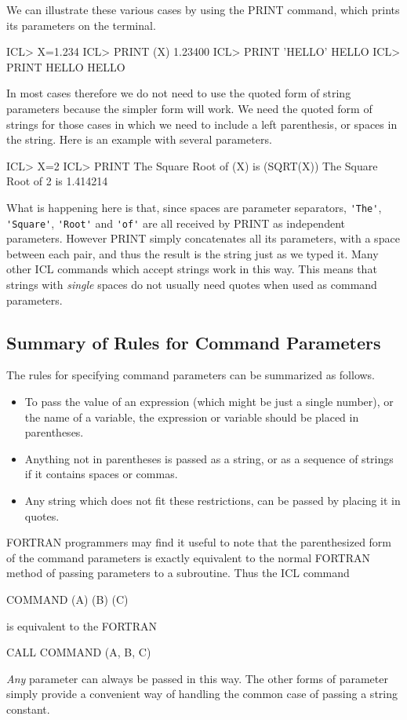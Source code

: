 \documentclass[twoside,11pt,nolof,chapters]{starlink}
\begin{document}
We can illustrate these various cases by using the PRINT command, which
prints its parameters on the terminal.
\begin{terminalv}
    ICL> X=1.234
    ICL> PRINT (X)
    1.23400
    ICL> PRINT 'HELLO'
    HELLO
    ICL> PRINT HELLO
    HELLO
\end{terminalv}
In most cases therefore we do not need to use the quoted form of string parameters
because the simpler form will work. We need the quoted form of strings for those
cases in which we need to include a left parenthesis, or spaces in the string.
Here is an example with several parameters.
\begin{terminalv}
    ICL> X=2
    ICL> PRINT The Square Root of (X) is (SQRT(X))
    The Square Root of          2 is 1.414214
\end{terminalv}
What is happening here is that, since spaces are parameter separators,
\verb+'The'+, \verb+'Square'+, \verb+'Root'+ and \verb+'of'+ are all
received by PRINT as independent parameters. However PRINT simply concatenates
all its parameters, with a space between each pair, and thus the result is the string
just as we typed it. Many other ICL commands which accept strings work in this
way. This means that strings with \emph{single} spaces do not usually need quotes
when used as command parameters.
\subsection{Summary of Rules for Command Parameters\label{parameter_rules}}
The rules for specifying command parameters can be summarized as follows.
\begin{itemize}
\item To pass the value of an expression (which might be just a single
number), or the name of a variable, the expression or variable should be placed
in parentheses.
\item Anything not in parentheses is passed as a string, or as a sequence of
strings if it contains spaces or commas.
\item Any string which does not fit these restrictions, can be passed by
placing it in quotes.
\end{itemize}
FORTRAN programmers may find it useful to note that the parenthesized form
of the command parameters is exactly equivalent to the normal FORTRAN method
of passing parameters to a subroutine. Thus the ICL command
\begin{terminalv}
    COMMAND (A) (B) (C)
\end{terminalv}
is equivalent to the FORTRAN
\begin{terminalv}
    CALL COMMAND (A, B, C)
\end{terminalv}
\emph{Any} parameter can always be passed in this way. The other forms of parameter
simply provide a convenient way of handling the common case of passing
a string constant.
\end{document}
